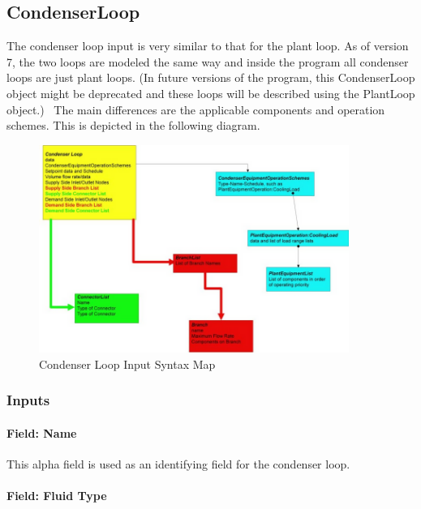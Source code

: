 \subsection{CondenserLoop}\label{condenserloop}

The condenser loop input is very similar to that for the plant loop. As of version 7, the two loops are modeled the same way and inside the program all condenser loops are just plant loops. (In future versions of the program, this CondenserLoop object might be deprecated and these loops will be described using the PlantLoop object.)~ The main differences are the applicable components and operation schemes. This is depicted in the following diagram.

\begin{figure}[hbtp] %
\centering
\includegraphics[width=0.9\textwidth, height=0.9\textheight, keepaspectratio=true]{media/image136.png}
\caption{Condenser Loop Input Syntax Map \protect \label{fig:condenser-loop-input-syntax-map}}
\end{figure}

\subsubsection{Inputs}\label{inputs-1-032}

\paragraph{Field: Name}\label{field-name-1-031}

This alpha field is used as an identifying field for the condenser loop.

\paragraph{Field: Fluid Type}\label{field-fluid-type-1-000}

